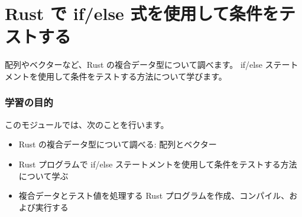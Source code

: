 \section{Rust で if/else 式を使用して条件をテストする}

配列やベクターなど、Rust の複合データ型について調べます。 if/else ステートメントを使用して条件をテストする方法について学びます。

\subsubsection{学習の目的}

このモジュールでは、次のことを行います。

\begin{itemize}
\item Rust の複合データ型について調べる: 配列とベクター
\item Rust プログラムで if/else ステートメントを使用して条件をテストする方法について学ぶ
\item 複合データとテスト値を処理する Rust プログラムを作成、コンパイル、および実行する
\end{itemize}

